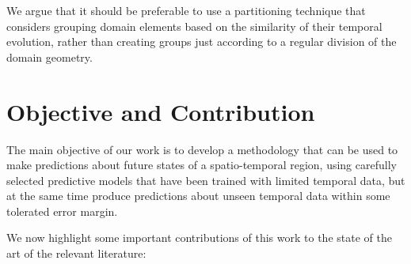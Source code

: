 We argue that it should be preferable to use a partitioning technique that considers grouping domain elements based on the similarity of their temporal evolution, rather than creating groups just according to a regular division of the domain geometry.

\section{Objective and Contribution}
\label{Sec:ObjectiveContribution}

The main objective of our work is to develop a methodology that can be used to make predictions about future states of a spatio-temporal region, using carefully selected predictive models that have been trained with limited temporal data, but at the same time produce predictions about unseen temporal data within some tolerated error margin. 

We now highlight some important contributions of this work to the state of the art of the relevant literature:

